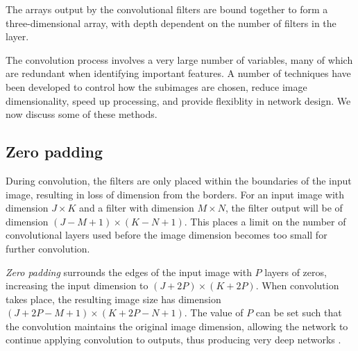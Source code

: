 

The arrays output by the convolutional filters are bound together to form a three-dimensional array, with depth dependent on the number of filters in the layer.

The convolution process involves a very large number of variables, many of which are redundant when identifying important features. A number of techniques have been developed to control how the subimages are chosen, reduce image dimensionality, speed up processing, and provide flexiblity in network design. We now discuss some of these methods.

\subsection*{Zero padding}\label{convnets-pad}

During convolution, the filters are only placed within the boundaries of the input image, resulting in loss of dimension from the borders. For an input image with dimension $J \times K$ and a filter with dimension $M \times N$, the filter output will be of dimension $(J - M + 1)\times (K - N + 1)$. This places a limit on the number of convolutional layers used before the image dimension becomes too small for further convolution.

\textit{Zero padding} surrounds the edges of the input image with $P$ layers of zeros, increasing the input dimension to  $(J+2P) \times (K+2P)$. When convolution takes place, the resulting image size has dimension $(J+2P - M + 1) \times (K + 2P - N + 1)$. The value of $P$ can be set such that the convolution maintains the original image dimension, allowing the network to continue applying convolution to outputs, thus producing very deep networks \citep{GoogLeNet2015}.

